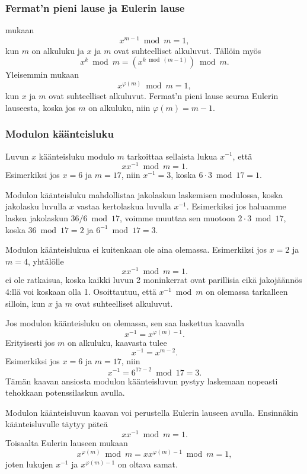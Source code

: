 \subsubsection{Fermat'n pieni lause ja Eulerin lause}


 mukaan
\[x^{m-1} \bmod m = 1,\]
kun $m$ on alkuluku ja $x$ ja $m$ ovat suhteelliset alkuluvut.
Tällöin myös
\[x^k \bmod m = (x^{k \bmod (m-1)}) \bmod m.\]
Yleisemmin  mukaan
\[x^{\varphi(m)} \bmod m = 1,\]
kun $x$ ja $m$ ovat suhteelliset alkuluvut.
Fermat'n pieni lause seuraa Eulerin lauseesta,
koska jos $m$ on alkuluku, niin $\varphi(m)=m-1$.

\subsubsection{Modulon käänteisluku}


Luvun $x$ käänteisluku modulo $m$
tarkoittaa sellaista lukua $x^{-1}$,
että
\[ x x^{-1} \bmod m = 1. \]
Esimerkiksi jos $x=6$ ja $m=17$,
niin $x^{-1}=3$, koska $6\cdot3 \bmod 17=1$.

Modulon käänteisluku mahdollistaa
jakolaskun laskemisen modulossa,
koska jakolasku luvulla $x$ vastaa
kertolaskua luvulla $x^{-1}$.
Esimerkiksi jos haluamme laskea
jakolaskun $36/6 \bmod 17$,
voimme muuttaa sen muotoon  $2 \cdot 3 \bmod 17$,
koska $36 \bmod 17 = 2$ ja $6^{-1} \bmod 17 = 3$.

Modulon käänteislukua ei
kuitenkaan ole aina olemassa.
Esimerkiksi jos $x=2$ ja $m=4$,
yhtälölle
\[ x x^{-1} \bmod m = 1. \]
ei ole ratkaisua, koska kaikki luvun 2
moninkerrat ovat parillisia eikä jakojäännös
4:llä voi koskaan olla 1.
Osoittautuu, että $x^{-1} \bmod m$
on olemassa tarkalleen silloin,
kun $x$ ja $m$ ovat suhteelliset alkuluvut.

Jos modulon käänteisluku on olemassa,
sen saa laskettua kaavalla
\[
x^{-1} = x^{\varphi(m)-1}.
\]
Erityisesti jos $m$ on alkuluku, kaavasta tulee
\[
x^{-1} = x^{m-2}.
\]
Esimerkiksi jos $x=6$ ja $m=17$, niin
\[x^{-1}=6^{17-2} \bmod 17 = 3.\]
Tämän kaavan ansiosta modulon käänteisluvun pystyy
laskemaan nopeasti tehokkaan potenssilaskun avulla.

Modulon käänteisluvun kaavan voi perustella Eulerin lauseen avulla.
Ensinnäkin käänteisluvulle täytyy päteä
\[
x x^{-1} \bmod m = 1.
\]
Toisaalta Eulerin lauseen mukaan
\[
x^{\varphi(m)} \bmod m =  xx^{\varphi(m)-1} \bmod m = 1,
\]
joten lukujen $x^{-1}$ ja $x^{\varphi(m)-1}$ on oltava samat.

